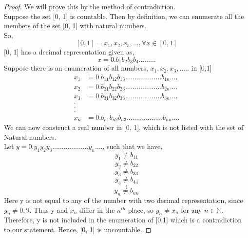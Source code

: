 \documentclass[letterpaper, 12pt]{article}
\newcommand{\1}{\mathds{1}}	%
\theoremstyle{definition}
\begin{document}
{
\begin{proof}
    We will prove this by the method of contradiction. \\
    Suppose the set [0, 1] is countable. Then by definition, we can enumerate all the members of the set [0, 1] with natural numbers. \\
    So, \[[0, 1] = x_1, x_2, x_3, ..., \forall x \in [0, 1]\]
    [0, 1] has a decimal representation given as, 
    \[x = 0.b_1b_2b_3b_4.........\]
    Suppose there is an enumeration of all numbers, $x_1, x_2, x_3, .....$ in [0,1]
    \begin{align*}
        x_1 &= 0.b_{11}b_{12}b_{13}...................b_{1n}.... \\ 
        x_2 &= 0.b_{21}b_{22}b_{23}...................b_{2n}.... \\
        x_3 &= 0.b_{31}b_{32}b_{33}...................b_{3n}.... \\
        . \\
        . \\
        . \\
        x_n &= 0.b_{n1}b_{n2}b_{n3}...................b_{nn}.... 
    \end{align*}
    We can now construct a real number in [0, 1], which is not listed with the set of Natural numbers. \\
    Let $y =0.y_1y_2y_3...................y_n....$, such that we have, 
    \[y_1 \neq b_{11}\]
    \[y_2 \neq b_{22}\]
    \[y_3 \neq b_{33}\]
    \[y_4 \neq b_{44}\]
    \[.\]
    \[.\]
    \[.\]
    \[y_n \neq b_{nn}\]
    Here y is not equal to any of the number with two decimal representation, since $y_n \neq 0, 9.$
    Thus y and $x_n$ differ in the $n^{th}$ place, so $y_n \neq x_n$ for any $n \in \mathbb{N}$.
    Therefore, y is not included in the enumeration of [0,1] which is a contradiction to our statement.
    Hence, [0, 1] is uncountable.
\end{proof}


}
\end{document}
